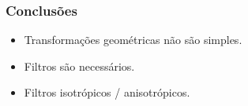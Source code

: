 \documentclass{beamer}
\begin{document}

\begin{frame}
\frametitle{Conclusões}
\begin{itemize}
 \item Transformações geométricas não são simples.
 \item Filtros são necessários.
 \item Filtros isotrópicos / anisotrópicos.
\end{itemize}
\end{frame}
\end{document}
